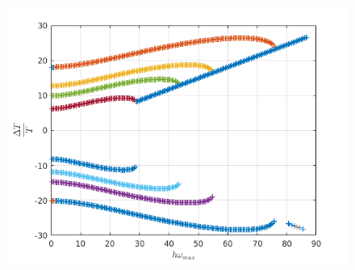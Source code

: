 \begin{itemize}
\begin{figure}[H]
\begin{minipage}{.5\textwidth}
\end{minipage}%
\begin{minipage}{.5\textwidth}
  \centering
  \includegraphics[width=1.\linewidth]{images/rel_per_err_pml_imp_10_80.png}
\end{minipage}%
\label{fig:rel_per_err_pml_imp_10}
\end{figure}


\end{itemize}
